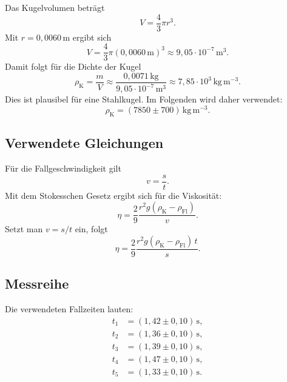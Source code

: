 \documentclass{report}
\begin{document}
Das Kugelvolumen beträgt
\begin{equation}
    V = \frac{4}{3}\pi r^3.
\end{equation}
Mit $r = 0{,}0060\,\mathrm{m}$ ergibt sich
\begin{equation}
    V = \frac{4}{3}\pi (0{,}0060\,\mathrm{m})^3
      \approx 9{,}05 \cdot 10^{-7}\,\mathrm{m^3}.
\end{equation}
Damit folgt für die Dichte der Kugel
\begin{equation}
    \rho_{\mathrm{K}} = \frac{m}{V}
    \approx \frac{0{,}0071\,\mathrm{kg}}{9{,}05 \cdot 10^{-7}\,\mathrm{m^3}}
    \approx 7{,}85 \cdot 10^3\,\mathrm{kg\,m^{-3}}.
\end{equation}
Dies ist plausibel für eine Stahlkugel. Im Folgenden wird daher verwendet:
\begin{equation}
    \rho_{\mathrm{K}} = (7850 \pm 700)\,\mathrm{kg\,m^{-3}}.
\end{equation}

\subsection{Verwendete Gleichungen}

Für die Fallgeschwindigkeit gilt
\begin{equation}
    v = \frac{s}{t}.
\end{equation}
\noindent
Mit dem Stokesschen Gesetz ergibt sich für die Viskosität:
\begin{equation}
    \eta = \frac{2}{9} \frac{r^2 g (\rho_{\mathrm{K}} - \rho_{\mathrm{Fl}})}{v}.
\end{equation}
\noindent
Setzt man $v = s/t$ ein, folgt
\begin{equation}
    \eta = \frac{2}{9} \frac{r^2 g (\rho_{\mathrm{K}} - \rho_{\mathrm{Fl}})\, t}{s}.
\end{equation}

\subsection{Messreihe}

Die verwendeten Fallzeiten lauten:
\begin{align}
    t_1 &= (1{,}42 \pm 0{,}10)\,\mathrm{s}, \\
    t_2 &= (1{,}36 \pm 0{,}10)\,\mathrm{s}, \\
    t_3 &= (1{,}39 \pm 0{,}10)\,\mathrm{s}, \\
    t_4 &= (1{,}47 \pm 0{,}10)\,\mathrm{s}, \\
    t_5 &= (1{,}33 \pm 0{,}10)\,\mathrm{s}.
\end{align}
\end{document}
